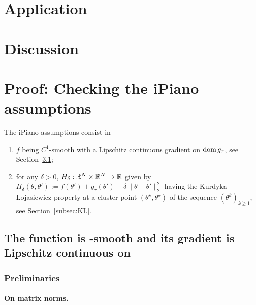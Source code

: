 \section{Application}
\label{sec:appli}


\section{Discussion}
\label{sec:discussion}

\section{Proof: Checking the iPiano assumptions}
\label{sec:iPiano}

The iPiano assumptions consist in 
\begin{enumerate}
\item  $f$  being  $C^{1}$-smooth  with a  Lipschitz  continuous  gradient  on
  $\operatorname{dom} g_{\tau}$, see Section~\ref{subsec:assum:f};
\item for  any $\delta >  0$, $H_{\delta} :  \mathbb{R}^N \times \mathbb{R}^{N}  \to \mathbb{R}$
  given                                                                     by
  $H_{\delta} (\theta,  \theta') := f(\theta')  + g_{\tau} (\theta')  + \delta
  \|\theta -  \theta'\|_{2}^{2}$ having the Kurdyka-Lojasiewicz  property at a
  cluster   point   $(\theta^{\star},   \theta^{\star})$   of   the   sequence
  $(\theta^{k})_{k \geq 1}$, see Section~\ref{subsec:KL}.
\end{enumerate}



\subsection{The function   is  -smooth and
  its gradient is Lipschitz continuous on }
\label{subsec:assum:f}

\subsubsection{Preliminaries}

\paragraph{On matrix norms.}


